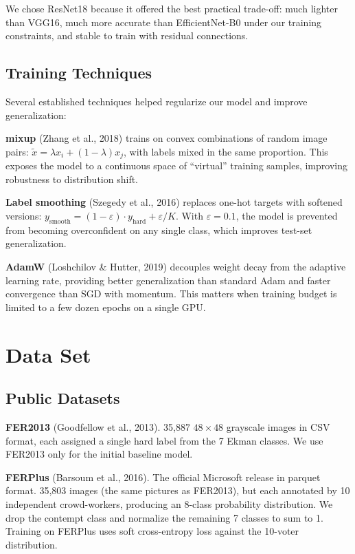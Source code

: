 \documentclass[12pt,a4paper]{article}
\begin{document}
We chose ResNet18 because it offered the best practical trade-off: much lighter than VGG16, much more accurate than EfficientNet-B0 under our training constraints, and stable to train with residual connections.

\subsection{Training Techniques}

Several established techniques helped regularize our model and improve generalization:

\textbf{mixup} (Zhang et al., 2018) trains on convex combinations of random image pairs: $\tilde{x} = \lambda x_i + (1-\lambda) x_j$, with labels mixed in the same proportion. This exposes the model to a continuous space of ``virtual'' training samples, improving robustness to distribution shift.

\textbf{Label smoothing} (Szegedy et al., 2016) replaces one-hot targets with softened versions: $y_{\text{smooth}} = (1-\varepsilon) \cdot y_{\text{hard}} + \varepsilon/K$. With $\varepsilon=0.1$, the model is prevented from becoming overconfident on any single class, which improves test-set generalization.

\textbf{AdamW} (Loshchilov \& Hutter, 2019) decouples weight decay from the adaptive learning rate, providing better generalization than standard Adam and faster convergence than SGD with momentum. This matters when training budget is limited to a few dozen epochs on a single GPU.

\section{Data Set}

\subsection{Public Datasets}

\textbf{FER2013} (Goodfellow et al., 2013). 35,887 $48\times48$ grayscale images in CSV format, each assigned a single hard label from the 7 Ekman classes. We use FER2013 only for the initial baseline model.

\textbf{FERPlus} (Barsoum et al., 2016). The official Microsoft release in parquet format. 35,803 images (the same pictures as FER2013), but each annotated by 10 independent crowd-workers, producing an 8-class probability distribution. We drop the contempt class and normalize the remaining 7 classes to sum to 1. Training on FERPlus uses soft cross-entropy loss against the 10-voter distribution.
\end{document}
